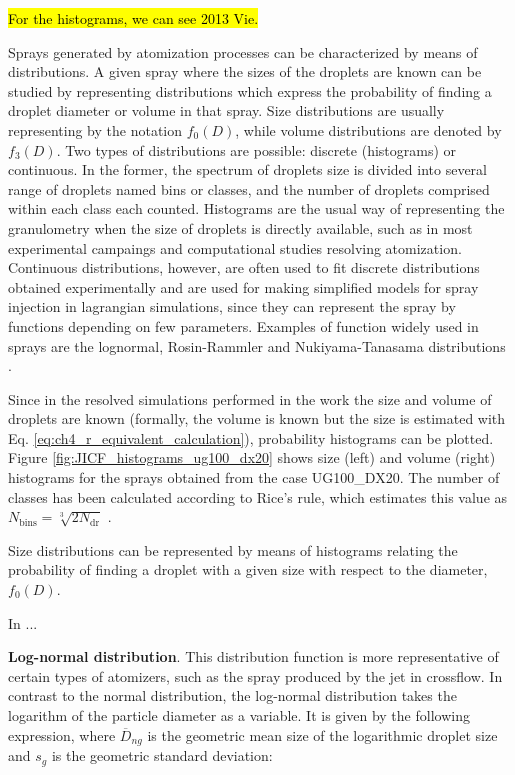 \hl{For the histograms, we can see 2013 Vie.}

Sprays generated by atomization processes can be characterized by means of distributions. A given spray where the sizes of the droplets are known can be studied by representing distributions which express the probability of finding a droplet diameter or volume in that spray. Size distributions are usually representing by the notation $f_0 \left( D \right)$, while volume distributions are denoted by $f_3 \left( D \right)$. Two types of distributions are possible: discrete (histograms) or continuous. In the former, the spectrum of droplets size is divided into several range of droplets named bins or classes, and the number of droplets comprised within each class each counted. Histograms are the usual way of representing the granulometry when the size of droplets is directly available, such as in most experimental campaings and computational studies resolving atomization. Continuous distributions, however, are often used to fit discrete distributions obtained experimentally and are used for making simplified models for spray injection in lagrangian simulations, since they can represent the spray by functions depending on few parameters. Examples of function widely used in sprays are the lognormal, Rosin-Rammler and Nukiyama-Tanasama distributions . 

Since in the resolved simulations performed in the work the size and volume of droplets are known (formally, the volume is known but the size is estimated with Eq. \ref{eq:ch4_r_equivalent_calculation}), probability histograms can be plotted. Figure \ref{fig:JICF_histograms_ug100_dx20} shows size (left) and volume (right) histograms for the sprays obtained from the case UG100\_DX20. The number of classes has been calculated according to Rice's rule, which estimates this value as $N_\mathrm{bins} = \sqrt[3]{2 N_\mathrm{dr}}$ .




Size distributions can be represented by means of histograms relating the probability of finding a droplet with a given size with respect to the diameter, $f_0 \left( D \right)$.



In  ...



\textbf{Log-normal distribution}. This distribution function is more representative of certain types of atomizers, such as the spray produced by the jet in crossflow. In contrast to the normal distribution, the log-normal distribution takes the logarithm of the particle diameter as a variable. It is given by the following expression, where $\overline{D}_{ng}$ is the geometric mean size of the logarithmic droplet size and $s_g$ is the geometric standard deviation:


